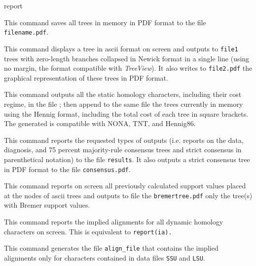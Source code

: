 \begin{command}{report}{}
\begin{poyexamples}
            {This command saves all trees in memory in
            PDF format to the file \texttt{filename.pdf}.}

            {This command displays a tree in ascii format on screen and outputs
            to \texttt{file1} trees with zero-length branches collapsed in Newick format
            in a single line (using no margin, the format compatible with \emph{TreeView}). It
            also writes to \texttt{file2.pdf} the graphical representation of these trees in
            PDF format.}

            {This command outputs all the static homology characters, including their cost
            regime, in the file ; then append to the same
            file the trees currently in memory using the Hennig format, 
            including the total cost of each tree in square brackets. The
            generated  is compatible with NONA, TNT, and
            Hennig86.   }
        
            {This command reports the requested types of outputs (i.e.
            reports on the data, diagnosis, and 75 percent majority-rule consensus 
            trees and strict consensus in parenthetical notation) to the file
            \texttt{results}. It also outputs a strict consensus tree in PDF format
            to the file \texttt{consensus.pdf}.}
     
            {This command reports on screen all previously calculated support values
             placed at the nodes of ascii trees and outputs to file the \texttt{bremertree.pdf}
             only the tree(s) with Bremer support values.}
     
            {This command reports the implied alignments for all dynamic homology
            characters on screen.  This is equivalent to \texttt{report(ia).}}
     
            {This command generates the file \texttt{align\_file} that contains
            the implied alignments only for characters contained in data files
            \texttt{SSU} and \texttt{LSU}.}
              

\end{poyexamples}
\end{command}
